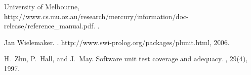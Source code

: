 \documentclass[british]{llncs}
\begin{document}
\begin{thebibliography}{10}
University of Melbourne,
  http://www.cs.mu.oz.au/research/mercury/information/doc-release/reference\_manual.pdf.
.

Jan Wielemaker.
.
\newblock http://www.swi-prolog.org/packages/plunit.html, 2006.

H.~Zhu, P.~Hall, and J.~May.
\newblock Software unit test coverage and adequacy.
, 29(4), 1997.

\end{thebibliography}
\end{document}
